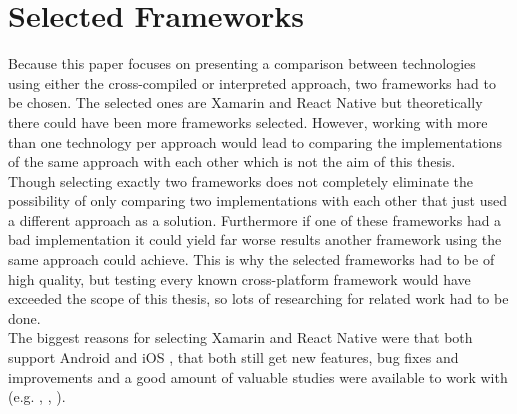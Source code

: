 \documentclass[Bachelor,BIF,english]{twbook}
\begin{document}
\chapter{Selected Frameworks}
Because this paper focuses on presenting a comparison between technologies using either the cross-compiled or interpreted approach, two frameworks had to be chosen. The selected ones are Xamarin and React Native but theoretically there could have been more frameworks selected. However, working with more than one technology per approach would lead to comparing the implementations of the same approach with each other which is not the aim of this thesis. 
\\[\baselineskip]
Though selecting exactly two frameworks does not completely eliminate the possibility of only comparing two implementations with each other that just used a different approach as a solution. Furthermore if one of these frameworks had a bad implementation it could yield far worse results another framework using the same approach could achieve. This is why the selected frameworks had to be of high quality, but testing every known cross-platform framework would have exceeded the scope of this thesis, so lots of researching for related work had to be done. 
\\[\baselineskip]
The biggest reasons for selecting Xamarin and React Native were that both support Android and iOS \cite[p.~1]{JohanssonSderberg2018} \cite[p.~12]{ZubaBernhard2017EdPb}, that both still get new features, bug fixes and improvements \cite{XamarinRoadmap} \cite{ReactNativeRoadmap} and a good amount of valuable studies were available to work with (e.g. \cite{Hansson_Vidhall_2016}, \cite{MartinezLecomte2018}, \cite{GaouarBenamarBendimerad2016}).
\end{document}
